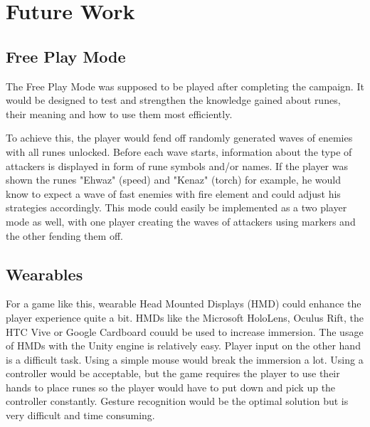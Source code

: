 \section{Future Work}

\subsection{Free Play Mode}

The Free Play Mode was supposed to be played after completing the campaign. It would be designed to test and strengthen the knowledge gained about runes, their meaning and how to use them most efficiently.

To achieve this, the player would fend off randomly generated waves of enemies with all runes unlocked. Before each wave starts, information about the type of attackers is displayed in form of rune symbols and/or names. If the player was shown the runes "Ehwaz" (speed) and "Kenaz" (torch) for example, he would know to expect a wave of fast enemies with fire element and could adjust his strategies accordingly.
This mode could easily be implemented as a two player mode as well, with one player creating the waves of attackers using markers and the other fending them off.

\subsection{Wearables}

For a game like this, wearable Head Mounted Displays (HMD) could enhance the player experience quite a bit. HMDs like the Microsoft HoloLens, Oculus Rift, the HTC Vive or Google Cardboard couuld be used to increase immersion.
The usage of HMDs with the Unity engine is relatively easy. Player input on the other hand is a difficult task.
Using a simple mouse would break the immersion a lot. Using a controller would be acceptable, but the game requires the player to use their hands to place runes so the player would have to put down and pick up the controller constantly. Gesture recognition would be the optimal solution but is very difficult and time consuming. 
